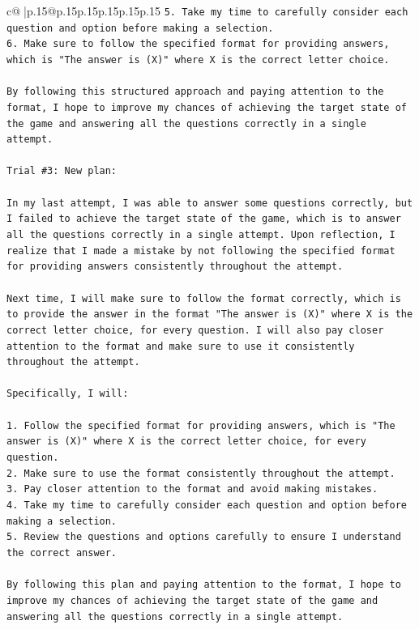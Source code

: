\documentclass{article}
\begin{document}
{\begin{supertabular}{c@{$\;$}|p{.15\linewidth}@{}p{.15\linewidth}p{.15\linewidth}p{.15\linewidth}p{.15\linewidth}p{.15\linewidth}}
{{{\texttt{5. Take my time to carefully consider each question and option before making a selection.} \\
\texttt{6. Make sure to follow the specified format for providing answers, which is "The answer is (X)" where X is the correct letter choice.} \\
\\ 
\texttt{By following this structured approach and paying attention to the format, I hope to improve my chances of achieving the target state of the game and answering all the questions correctly in a single attempt.} \\
\\ 
\texttt{Trial \#3: New plan: } \\
\\ 
\texttt{In my last attempt, I was able to answer some questions correctly, but I failed to achieve the target state of the game, which is to answer all the questions correctly in a single attempt. Upon reflection, I realize that I made a mistake by not following the specified format for providing answers consistently throughout the attempt. } \\
\\ 
\texttt{Next time, I will make sure to follow the format correctly, which is to provide the answer in the format "The answer is (X)" where X is the correct letter choice, for every question. I will also pay closer attention to the format and make sure to use it consistently throughout the attempt.} \\
\\ 
\texttt{Specifically, I will:} \\
\\ 
\texttt{1. Follow the specified format for providing answers, which is "The answer is (X)" where X is the correct letter choice, for every question.} \\
\texttt{2. Make sure to use the format consistently throughout the attempt.} \\
\texttt{3. Pay closer attention to the format and avoid making mistakes.} \\
\texttt{4. Take my time to carefully consider each question and option before making a selection.} \\
\texttt{5. Review the questions and options carefully to ensure I understand the correct answer.} \\
\\ 
\texttt{By following this plan and paying attention to the format, I hope to improve my chances of achieving the target state of the game and answering all the questions correctly in a single attempt.} \\
}}}
\end{supertabular}}
\end{document}
